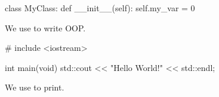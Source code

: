 \documentclass[a4paper, 12pt]{article}
\begin{document}
\begin{python}
class MyClass:
    def __init__(self):
        self.my_var = 0
\end{python}

We use  to write OOP.

\begin{cpp}
# include <iostream>

int main(void)
{
    std::cout << "Hello World!" << std::endl;
}
\end{cpp}

We use  to print.
\end{document}

